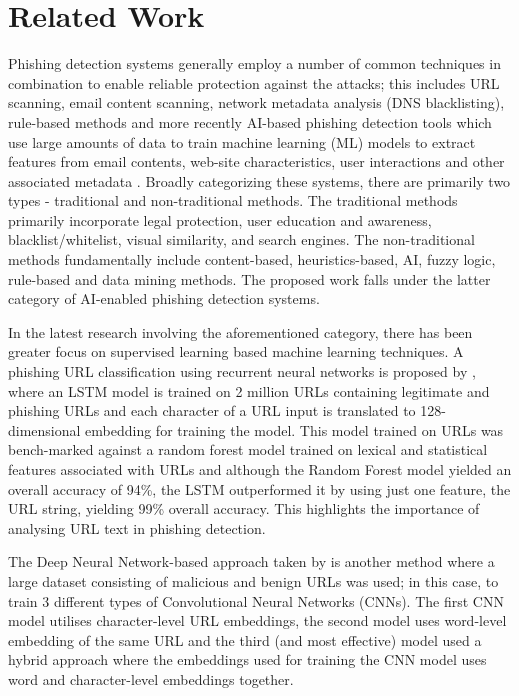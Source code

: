 \section{Related Work \label{related}
}

Phishing detection systems generally employ a number of common techniques in combination to enable reliable protection against the attacks; this includes URL scanning, email content scanning, network metadata analysis (DNS blacklisting), rule-based methods and more recently AI-based phishing detection tools which use large amounts of data to train machine learning (ML) models to extract features from email contents, web-site characteristics, user interactions and other associated metadata \cite{b7}. Broadly categorizing these systems, there are primarily two types - traditional and non-traditional methods. The traditional methods primarily incorporate legal protection, user education and awareness, blacklist/whitelist, visual similarity, and search engines. The non-traditional methods fundamentally include content-based, heuristics-based, AI, fuzzy logic, rule-based and data mining methods. The proposed work falls under the latter category of AI-enabled phishing detection systems.

In the latest research involving the aforementioned category, there has been greater focus on supervised learning based machine learning techniques. A phishing URL classification using recurrent neural networks is proposed by \cite{b8}, where an LSTM model is trained on 2 million URLs containing legitimate and phishing URLs and each character of a URL input is translated to 128-dimensional embedding for training the model. This model trained on URLs was bench-marked against a random forest model trained on lexical and statistical features associated with URLs and although the Random Forest model yielded an overall accuracy of 94\%, the LSTM outperformed it by using just one feature, the URL string, yielding 99\% overall accuracy. This highlights the importance of analysing URL text in phishing detection.

The Deep Neural Network-based approach taken by \cite{b9} is another method where a large dataset consisting of malicious and benign URLs was used; in this case, to train 3 different types of Convolutional Neural Networks (CNNs). The first CNN model utilises character-level URL embeddings, the second model uses word-level embedding of the same URL and the third (and most effective) model used a hybrid approach where the embeddings used for training the CNN model uses word and character-level embeddings together.

